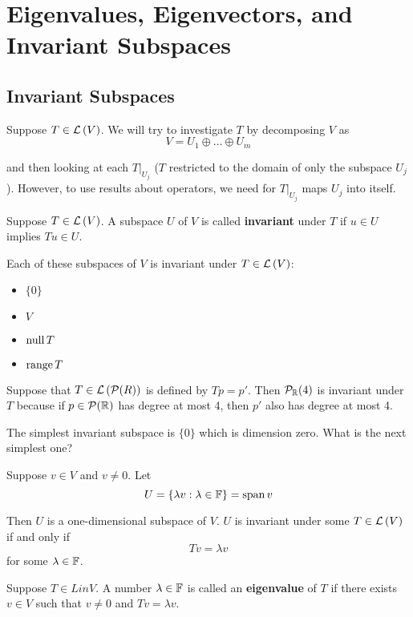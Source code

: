 
\section{Eigenvalues, Eigenvectors, and Invariant Subspaces}

\subsection{Invariant Subspaces}
Suppose $T \in \mathcal{L} \left( V \right)$. We will try to investigate $T$ by decomposing $V$
as
\[ V = U_1 \oplus \dots \oplus U_m \]

and then looking at each $T \Bigr|_{U_j}$ ($T$ restricted to the domain
of only the subspace $U_j$). However, to use results about operators,
we need for $T \Bigr|_{U_j}$ maps $U_j$ into itself.

\begin{definition} 
    Suppose $T \in \mathcal{L} \left( V \right)$. A subspace $U$ of $V$ is called \textbf{invariant} under
    $T$ if $u \in U$ implies $Tu \in U$.
\end{definition}

\begin{example}
    Each of these subspaces of $V$ is invariant under $T \in \mathcal{L} \left( V \right)$:
    \begin{itemize}
        \item $\{ 0 \}$
        \item $V$
        \item $\operatorname{null} T$
        \item $\operatorname{range} T$
    \end{itemize}

    Suppose that $T \in \mathcal{L} \left( \mathcal{P}(R) \right)$ is defined by $Tp = p'$. Then
    $\mathcal{P}_{\operatorname{\mathbb{R}}}(4)$ is invariant under $T$ because if $p \in \mathcal{P}(\operatorname{\mathbb{R}})$ has degree
    at most 4, then $p'$ also has degree at most 4.
\end{example}

The simplest invariant subspace is $\{ 0 \}$ which is dimension zero. What
is the next simplest one?

Suppose $v \in V$ and $v \neq 0$. Let
\[ U = \{ \lambda v : \lambda \in \operatorname{\mathbb{F}} \} = \operatorname{span}{v} \]

Then $U$ is a one-dimensional subspace of $V$. $U$ is invariant under some $T \in \mathcal{L} \left( V \right)$
if and only if
\[ Tv = \lambda v \]
for some $\lambda \in \operatorname{\mathbb{F}}$.

\begin{definition}
    Suppose $T \in Lin{V}$. A number $\lambda \in \operatorname{\mathbb{F}}$ is called an \textbf{eigenvalue}
    of $T$ if there exists $v \in V$ such that $v \neq 0$ and $Tv = \lambda v$.
\end{definition}


